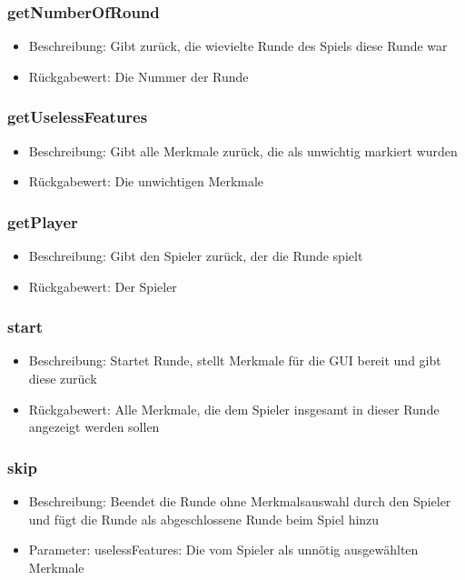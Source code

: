 \documentclass[a4paper]{scrreprt}
\begin{document}
    \subsubsection{getNumberOfRound}
    \begin{itemize}
        \item Beschreibung: Gibt zurück, die wievielte Runde des Spiels diese Runde war
        \item Rückgabewert: Die Nummer der Runde
    \end{itemize}
    \subsubsection{getUselessFeatures}
    \begin{itemize}
        \item Beschreibung: Gibt alle Merkmale zurück, die als unwichtig markiert wurden
        \item Rückgabewert: Die unwichtigen Merkmale
    \end{itemize}
    \subsubsection{getPlayer}
    \begin{itemize}
        \item Beschreibung: Gibt den Spieler zurück, der die Runde spielt
        \item Rückgabewert: Der Spieler
    \end{itemize}
    \subsubsection{start}
    \begin{itemize}
        \item Beschreibung: Startet Runde, stellt Merkmale für die GUI bereit und gibt diese zurück
        \item Rückgabewert: Alle Merkmale, die dem Spieler insgesamt in dieser Runde angezeigt werden sollen
    \end{itemize}
    \subsubsection{skip}
    \begin{itemize}
        \item Beschreibung: Beendet die Runde ohne Merkmalsauswahl durch den Spieler und fügt die Runde als abgeschlossene Runde beim Spiel hinzu
        \item Parameter: uselessFeatures: Die vom Spieler als unnötig ausgewählten Merkmale
    \end{itemize}
\end{document}
